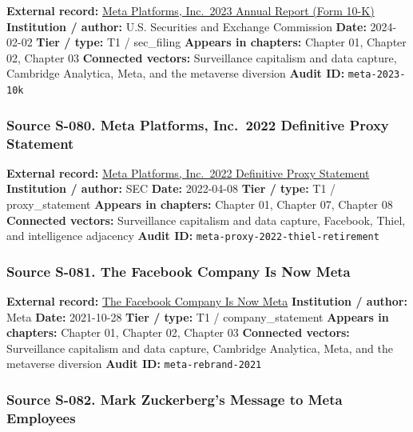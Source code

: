 \documentclass[
  american,
  11pt,
  letterpaper,
]{article}
\begin{document}
\textbf{External record:}
\href{https://www.sec.gov/Archives/edgar/data/1326801/000132680124000012/meta-20231231.htm}{Meta
Platforms, Inc.~2023 Annual Report (Form 10-K)} \textbf{Institution /
author:} U.S. Securities and Exchange Commission \textbf{Date:}
2024-02-02 \textbf{Tier / type:} T1 / sec\_filing \textbf{Appears in
chapters:} Chapter 01, Chapter 02, Chapter 03 \textbf{Connected
vectors:} Surveillance capitalism and data capture, Cambridge Analytica,
Meta, and the metaverse diversion \textbf{Audit ID:}
\texttt{meta-2023-10k}

\subsubsection{Source S-080. Meta Platforms, Inc.~2022 Definitive Proxy
Statement}\label{source-s-080-meta-platforms-inc-2022-definitive-proxy-statement}

\textbf{External record:}
\href{https://www.sec.gov/Archives/edgar/data/1326801/000132680122000043/meta2022definitiveproxysta.htm}{Meta
Platforms, Inc.~2022 Definitive Proxy Statement} \textbf{Institution /
author:} SEC \textbf{Date:} 2022-04-08 \textbf{Tier / type:} T1 /
proxy\_statement \textbf{Appears in chapters:} Chapter 01, Chapter 07,
Chapter 08 \textbf{Connected vectors:} Surveillance capitalism and data
capture, Facebook, Thiel, and intelligence adjacency \textbf{Audit ID:}
\texttt{meta-proxy-2022-thiel-retirement}

\subsubsection{Source S-081. The Facebook Company Is Now
Meta}\label{source-s-081-the-facebook-company-is-now-meta}

\textbf{External record:}
\href{https://about.fb.com/news/2021/10/facebook-company-is-now-meta/}{The
Facebook Company Is Now Meta} \textbf{Institution / author:} Meta
\textbf{Date:} 2021-10-28 \textbf{Tier / type:} T1 / company\_statement
\textbf{Appears in chapters:} Chapter 01, Chapter 02, Chapter 03
\textbf{Connected vectors:} Surveillance capitalism and data capture,
Cambridge Analytica, Meta, and the metaverse diversion \textbf{Audit
ID:} \texttt{meta-rebrand-2021}

\subsubsection{Source S-082. Mark Zuckerberg's Message to Meta
Employees}\label{source-s-082-mark-zuckerberg-s-message-to-meta-employees}
\end{document}
